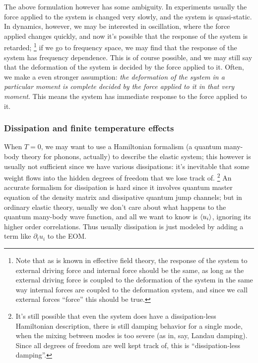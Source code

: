 \documentclass[hyperref, a4paper]{article}
\begin{document}
The above formulation however has some ambiguity.
In experiments usually the force applied to the system 
is changed very slowly,
and the system is quasi-static.
In dynamics, however, we may be interested in oscillation,
where the force applied changes quickly,
and now it's possible that the response of the system is retarded;%
\footnote{
    Note that as is known in effective field theory,
    the response of the system to external driving force 
    and internal force should be the same,
    as long as the external driving force is coupled to the 
    deformation of the system in the same way 
    internal forces are coupled to the deformation system,
    and since we call external forces ``force'' 
    this should be true.
}
if we go to frequency space,
we may find that the response of the system has frequency dependence.
This is of course possible,
and we may still say that 
the deformation of the system is decided by the force applied to it.
Often, we make a even stronger assumption:
\emph{the deformation of the system in a particular moment 
is complete decided by the force applied to it in that very moment}.
This means the system has immediate response to the force applied to it.

\subsubsection{Dissipation and finite temperature effects}

When $T = 0$, we may want to use a Hamiltonian formalism 
(a quantum many-body theory for phonons, actually)
to describe the elastic system;
this however is usually not sufficient 
since we have various dissipations:
it's inevitable that some weight 
flows into the hidden degrees of freedom
that we lose track of.%
\footnote{
    It's still possible that even the system does have a 
    dissipation-less Hamiltonian description,
    there is still damping behavior for a single mode,
    when the mixing between modes is too severe 
    (as in, say, Landau damping).
    Since all degrees of freedom are well kept track of,
    this is ``dissipation-less damping''.
}
An accurate formalism for dissipation is hard 
since it involves quantum master equation of the density matrix 
and dissipative quantum jump channels;
but in ordinary elastic theory,
usually we don't care about  what happens to the quantum many-body wave function,
and all we want to know is $\expval{u_i}$,
ignoring its higher order correlations.
Thus usually dissipation is just modeled 
by adding a term like $\partial_t u_i$ to the EOM.
\end{document}

